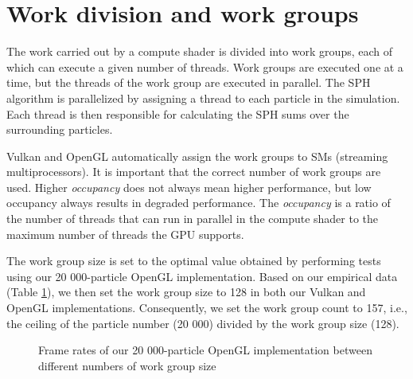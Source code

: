 \documentclass[a4paper, 12pt, oneside]{book}
\begin{document}
\section{Work division and work groups}
\begin{doublespace}
    The work carried out by a compute shader is divided into work groups, each of which can execute a given number of threads. Work groups are executed one at a time, but the threads of the work group are executed in parallel. The SPH algorithm is parallelized by assigning a thread to each particle in the simulation. Each thread is then responsible for calculating the SPH sums over the surrounding particles.
    
    Vulkan and OpenGL automatically assign the work groups to SMs (streaming multiprocessors). It is important that the correct number of work groups are used. Higher \textit{occupancy} does not always mean higher performance, but low occupancy always results in degraded performance. The \textit{occupancy} is a ratio of the number of threads that can run in parallel in the compute shader to the maximum number of threads the GPU supports.
    
    The work group size is set to the optimal value obtained by performing tests using our 20 000-particle OpenGL implementation. Based on our empirical data (Table \ref{fig:work group test}), we then set the work group size to 128 in both our Vulkan and OpenGL implementations. Consequently, we set the work group count to 157, i.e., the ceiling of the particle number (20 000) divided by the work group size (128).
    
    \begin{figure}[!ht]
        \centering
        \caption{Frame rates of our 20 000-particle OpenGL implementation between different numbers of work group size}
        \label{fig:work group test}
    \end{figure}
    
\end{doublespace}
\end{document}
